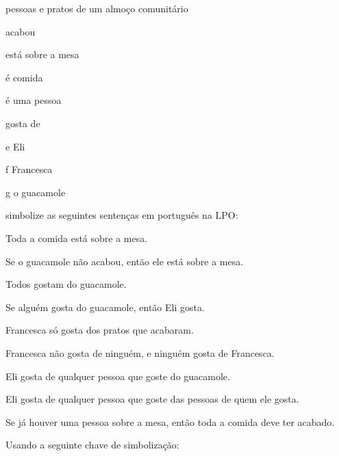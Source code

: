 \begin{ekey}
\item[\text{domínio}] pessoas e pratos de um almoço comunitário
\item[\atom{R}{x}]  acabou
\item[\atom{T}{x}]  está sobre a mesa
\item[\atom{F}{x}]  é comida
\item[\atom{P}{x}]  é uma pessoa
\item[\atom{L}{x,y}]  gosta de 
\item[e] Eli
\item[f] Francesca
\item[g] o guacamole
\end{ekey}
simbolize as seguintes sentenças em português na LPO:
\begin{compactlist}
\item Toda a comida está sobre a mesa.
\item Se o guacamole não acabou, então ele está sobre a mesa.
\item Todos gostam do guacamole.
\item Se alguém gosta do guacamole, então Eli gosta.
\item Francesca só gosta dos pratos que acabaram.
\item Francesca não gosta de ninguém, e ninguém gosta de Francesca.
\item Eli gosta de qualquer pessoa que goste do guacamole.
\item Eli gosta de qualquer pessoa que goste das pessoas de quem ele gosta.
\item Se já houver uma pessoa sobre a mesa, então toda a comida deve ter acabado.
\end{compactlist}


\solutions
\problempart
Usando a seguinte chave de simbolização:
\label{pr.FOLballet}

